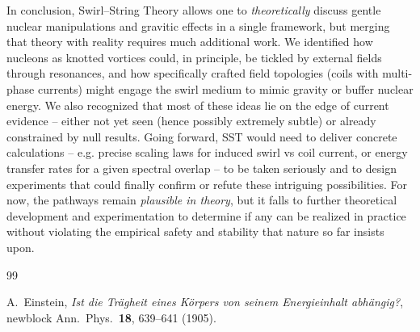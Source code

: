 \documentclass[11pt]{article}
\begin{document}
In conclusion, Swirl–String Theory allows one to \textit{theoretically} discuss gentle nuclear manipulations and gravitic effects in a single framework, but merging that theory with reality requires much additional work. We identified how nucleons as knotted vortices could, in principle, be tickled by external fields through resonances, and how specifically crafted field topologies (coils with multi-phase currents) might engage the swirl medium to mimic gravity or buffer nuclear energy. We also recognized that most of these ideas lie on the edge of current evidence – either not yet seen (hence possibly extremely subtle) or already constrained by null results. Going forward, SST would need to deliver concrete calculations – e.g. precise scaling laws for induced swirl vs coil current, or energy transfer rates for a given spectral overlap – to be taken seriously and to design experiments that could finally confirm or refute these intriguing possibilities. For now, the pathways remain \textit{plausible in theory}, but it falls to further theoretical development and experimentation to determine if any can be realized in practice without violating the empirical safety and stability that nature so far insists upon.




        
        \begin{thebibliography}{99}

             A.~Einstein, \newblock \emph{Ist die Tr\"agheit eines K\"orpers von seinem Energieinhalt
            abh\"angig?}, newblock Ann.\ Phys.\ \textbf{18}, 639--641 (1905).

        \end{thebibliography}
\end{document}
